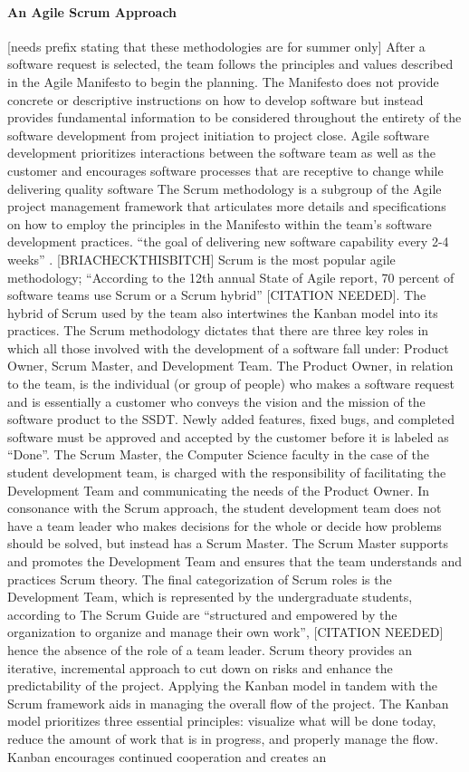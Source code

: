 \paragraph{An Agile Scrum Approach} [needs prefix stating that these methodologies are for summer only]
After a software request is selected, the team follows the principles and values described in the Agile Manifesto to begin the planning. The Manifesto does not provide concrete or descriptive instructions on how to develop software but instead provides fundamental information to be considered throughout the entirety of the software development from project initiation to project close. Agile software development prioritizes interactions between the software team as well as the customer and encourages software processes that are receptive to change while delivering quality software \cite{agilemanifesto} The Scrum methodology is a subgroup of the Agile project management framework that articulates more details and specifications on how to employ the principles in the Manifesto within the team's software development practices.  ``the goal of delivering new software capability every 2-4 weeks'' \cite{thescrumguide}. [BRIACHECKTHISBITCH] Scrum is the most popular agile methodology; ``According to the 12th annual State of Agile report, 70 percent of software teams use Scrum or a Scrum hybrid'' [CITATION NEEDED]. The hybrid of Scrum used by the team also intertwines the Kanban model into its practices. The Scrum methodology dictates that there are three key roles in which all those involved with the development of a software fall under: Product Owner, Scrum Master, and Development Team. The Product Owner, in relation to the team, is the individual (or group of people) who makes a software request and is essentially a customer who conveys the vision and the mission of the software product to the SSDT. Newly added features, fixed bugs, and completed software must be approved and accepted by the customer before it is labeled as ``Done''. The Scrum Master, the Computer Science faculty in the case of the student development team, is charged with the responsibility of facilitating the Development Team and communicating the needs of the Product Owner. In consonance with the Scrum approach, the student development team does not have a team leader who makes decisions for the whole or decide how problems should be solved, but instead has a Scrum Master. The Scrum Master supports and promotes the Development Team and ensures that the team understands and practices Scrum theory. The final categorization of Scrum roles is the Development Team, which is represented by the undergraduate students, according to The Scrum Guide are ``structured and empowered by the organization to organize and manage their own work'', [CITATION NEEDED] hence the absence of the role of a team leader. Scrum theory provides an iterative, incremental approach to cut down on risks and enhance the predictability of the project. Applying the Kanban model in tandem with the Scrum framework aids in managing the overall flow of the project. The Kanban model prioritizes three essential principles: visualize what will be done today,  reduce the amount of work that is in progress, and properly manage the flow. Kanban encourages continued cooperation and creates an 